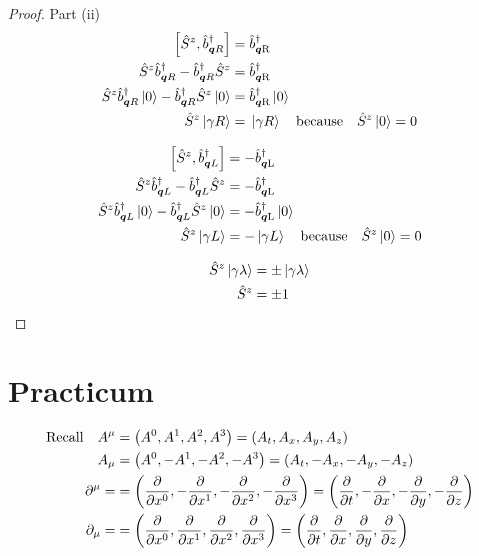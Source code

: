 \documentclass[letterpaper]{article}
\theoremstyle{definition}
\begin{document}
\begin{proof}Part (ii)
  \begin{align*}
    \bqty{\hat{S}^z,\hat{b}^\dagger_{\vb*{q}R}}                                             & =\hat{b}^\dagger_{\vb*{q}\text{R}}              \\
    \hat{S}^z\hat{b}^\dagger_{\vb*{q}R}-\hat{b}^\dagger_{\vb*{q}R}\hat{S}^z                 & =\hat{b}^\dagger_{\vb*{q}\text{R}}              \\
    \hat{S}^z\hat{b}^\dagger_{\vb*{q}R}\ket*{0}-\hat{b}^\dagger_{\vb*{q}R}\hat{S}^z\ket*{0} & =\hat{b}^\dagger_{\vb*{q}\text{R}}\ket*{0}      \\
    \hat{S}^z\ket*{\gamma R}                                                                & =\ket*{\gamma R}\qq{because}\hat{S}^z\ket*{0}=0 \\
  \end{align*}

  \begin{align*}
    \bqty{\hat{S}^z,\hat{b}^\dagger_{\vb*{q}L}}                                             & =-\hat{b}^\dagger_{\vb*{q}\text{L}}              \\
    \hat{S}^z\hat{b}^\dagger_{\vb*{q}L}-\hat{b}^\dagger_{\vb*{q}L}\hat{S}^z                 & =-\hat{b}^\dagger_{\vb*{q}\text{L}}              \\
    \hat{S}^z\hat{b}^\dagger_{\vb*{q}L}\ket*{0}-\hat{b}^\dagger_{\vb*{q}L}\hat{S}^z\ket*{0} & =-\hat{b}^\dagger_{\vb*{q}\text{L}}\ket*{0}      \\
    \hat{S}^z\ket*{\gamma L}                                                                & =-\ket*{\gamma L}\qq{because}\hat{S}^z\ket*{0}=0 \\
  \end{align*}

  \begin{align*}
    \hat{S}^z\ket*{\gamma \lambda} & =\pm\ket*{\gamma \lambda} \\
    \hat{S}^z                      & =\pm 1                    \\
  \end{align*}
\end{proof}

\section*{Practicum}

\begin{align*}
  \qq*{Recall}A^\mu & =\pqty{A^0,A^1,A^2,A^3}=\pqty{A_t,A_x,A_y,A_z}                                               \\
  A_\mu             & =\pqty{A^0,-A^1,-A^2,-A^3}=\pqty{A_t,-A_x,-A_y,-A_z}                                         \\
  \partial^\mu=     & =\pqty{\pdv{x^0},-\pdv{x^1},-\pdv{x^2},-\pdv{x^3}}=\pqty{\pdv{t},-\pdv{x},-\pdv{y},-\pdv{z}} \\
  \partial_\mu=     & =\pqty{\pdv{x^0},\pdv{x^1},\pdv{x^2},\pdv{x^3}}=\pqty{\pdv{t},\pdv{x},\pdv{y},\pdv{z}}       \\
\end{align*}
\end{document}
